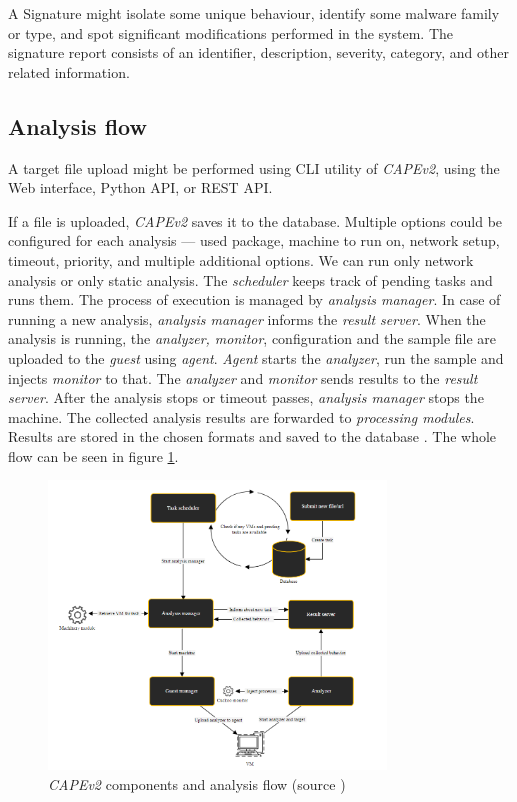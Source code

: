 A Signature might isolate some unique behaviour, identify some malware family or type, and spot significant modifications performed in the system. The signature report consists of an identifier, description, severity, category, and other related information.

\subsection{Analysis flow}
A target file upload might be performed using CLI utility of \emph{CAPEv2}, using the Web interface,  Python API, or REST API.

If a file is uploaded, \emph{CAPEv2} saves it to the database. Multiple options could be configured for each analysis ---  used package, machine to run on, network setup, timeout, priority, and multiple additional options. We can run only network analysis or only static analysis. The \emph{scheduler} keeps track of pending tasks and runs them. The process of execution is managed by \emph{analysis manager}. In case of running a new analysis, \emph{analysis manager} informs the \emph{result server}. When the analysis is running, the \emph{analyzer, monitor}, configuration and the sample file are uploaded to the \emph{guest} using \emph{agent}. \emph{Agent} starts the \emph{analyzer}, run the sample and injects \emph{monitor} to that. The \emph{analyzer} and \emph{monitor} sends results to the \emph{result server}. After the analysis stops or timeout passes, \emph{analysis manager} stops the machine. The collected analysis results are forwarded to \emph{processing modules}. Results are stored in the chosen formats and saved to the database \cite{CuckooSa10:online}. The whole flow can be seen in figure \ref{fig:capeflow}.

\begin{figure}[h]
  \centering
  \includegraphics[width=0.8\textwidth]{figures/flow.png}
  \caption{\emph{CAPEv2} components and analysis flow (source \cite{CuckooSa10:online})}
  \label{fig:capeflow}
\end{figure}



